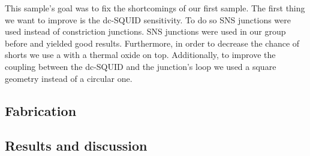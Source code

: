 This sample's goal was to fix the shortcomings of our first sample. The first thing we want to improve is the dc-SQUID sensitivity. To do so SNS junctions were used instead of constriction junctions. SNS junctions were used in our group before and yielded good results.\cite{rogSQUIDontipMagneticMicroscopy2022} Furthermore, in order to decrease the chance of shorts we use a  with a thermal oxide on top. Additionally, to improve the coupling between the dc-SQUID and the junction's loop we used a square geometry instead of a circular one. 

\subsection{Fabrication}
\label{sec:CP2.6B-fabrication}


\subsection{Results and discussion}
